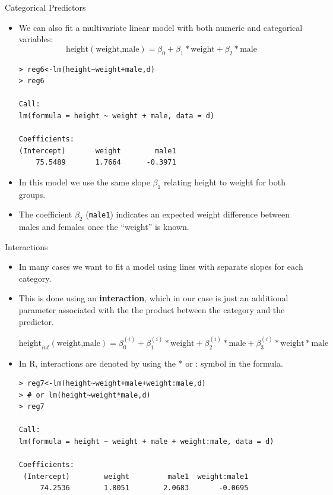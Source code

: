 \documentclass[handout]{beamer}
\begin{document}
\begin{frame}[fragile]{Categorical Predictors}
\scriptsize{ 
\begin{itemize}
\item We can also fit a multivariate linear model with both numeric and categorical variables:
  \begin{displaymath}
  \text{height}(\text{weight,male})=\beta_0+\beta_1*\text{weight}+\beta_2*\text{male}
 \end{displaymath} 

\begin{verbatim}
> reg6<-lm(height~weight+male,d)
> reg6

Call:
lm(formula = height ~ weight + male, data = d)

Coefficients:
(Intercept)       weight        male1  
    75.5489       1.7664      -0.3971  
\end{verbatim} 
 
\item In this model we use the same slope $\beta_1$ relating height to weight for both groups.

\item The coefficient $\beta_2$ (\verb+male1+) indicates an expected weight difference between males and females once the ``weight'' is known.
 
\end{itemize}





}
\end{frame}

\begin{frame}[fragile]{Interactions}
\scriptsize{ 
\begin{itemize}
\item In many cases we want to fit a model using lines with separate slopes for each category.

\item This is done using an \textbf{interaction}, which in our case is just an additional parameter associated with the the product between the category and the predictor.

  \begin{displaymath}
  \text{height}_{int}(\text{weight,male})=\beta_0^{(i)}+\beta_1^{(i)}*\text{weight}+\beta_2^{(i)}*\text{male}+\beta_3^{(i)}*\text{weight}*\text{male}
 \end{displaymath}

\item In R, interactions are denoted by using the * or : symbol in the formula.
\begin{verbatim}
> reg7<-lm(height~weight+male+weight:male,d)
> # or lm(height~weight*male,d)
> reg7

Call:
lm(formula = height ~ weight + male + weight:male, data = d)

Coefficients:
 (Intercept)        weight         male1  weight:male1  
     74.2536        1.8051        2.0683       -0.0695  
\end{verbatim} 
 

\end{itemize}



}
\end{frame}
\end{document}
